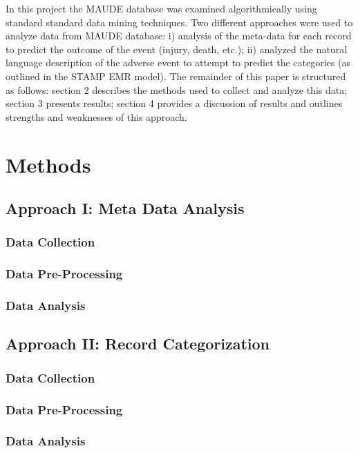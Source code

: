 \documentclass[11pt, notitlepage,abstracton,oneside]{article}   	%
\begin{document}
In this project the MAUDE database was examined algorithmically using standard standard data mining techniques. Two different approaches were used to analyze data from MAUDE database:  i) analysis of the meta-data for each record to predict the outcome of the event (injury, death, etc.); ii) analyzed the natural language description of the adverse event to attempt to predict the categories (as outlined in the STAMP EMR model). The remainder of this paper is structured as follows: section 2 describes the methods used to collect and analyze this data; section 3 presents results; section 4 provides a discussion of results and outlines strengths and weaknesses of this approach. 

\section{Methods}

\subsection{Approach I: Meta Data Analysis}

\subsubsection{Data Collection}

\subsubsection{Data Pre-Processing}

\subsubsection{Data Analysis}

\subsection{Approach II: Record Categorization}
\subsubsection{Data Collection}

\subsubsection{Data Pre-Processing}

\subsubsection{Data Analysis}
\end{document}
